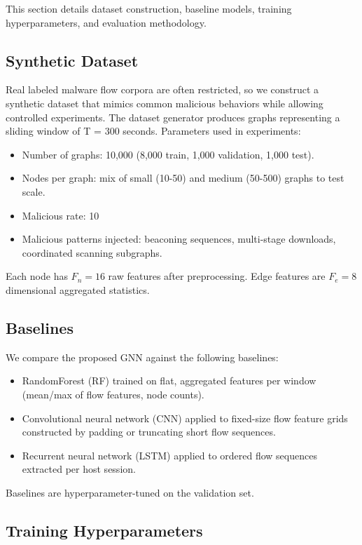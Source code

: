 \documentclass[conference]{IEEEtran}
\begin{document}
This section details dataset construction, baseline models, training hyperparameters, and evaluation methodology.

\subsection{Synthetic Dataset}

Real labeled malware flow corpora are often restricted, so we construct a synthetic dataset that mimics common malicious behaviors while allowing controlled experiments. The dataset generator produces graphs representing a sliding window of T = 300 seconds. Parameters used in experiments:

\begin{itemize}
	\item Number of graphs: 10,000 (8,000 train, 1,000 validation, 1,000 test).
	\item Nodes per graph: mix of small (10-50) and medium (50-500) graphs to test scale.
	\item Malicious rate: 10%
	\item Malicious patterns injected: beaconing sequences, multi-stage downloads, coordinated scanning subgraphs.
\end{itemize}

Each node has $F_n = 16$ raw features after preprocessing. Edge features are $F_e = 8$ dimensional aggregated statistics.

\subsection{Baselines}

We compare the proposed GNN against the following baselines:

\begin{itemize}
	\item RandomForest (RF) trained on flat, aggregated features per window (mean/max of flow features, node counts).
	\item Convolutional neural network (CNN) applied to fixed-size flow feature grids constructed by padding or truncating short flow sequences.
	\item Recurrent neural network (LSTM) applied to ordered flow sequences extracted per host session.
\end{itemize}

Baselines are hyperparameter-tuned on the validation set.

\subsection{Training Hyperparameters}
\end{document}
